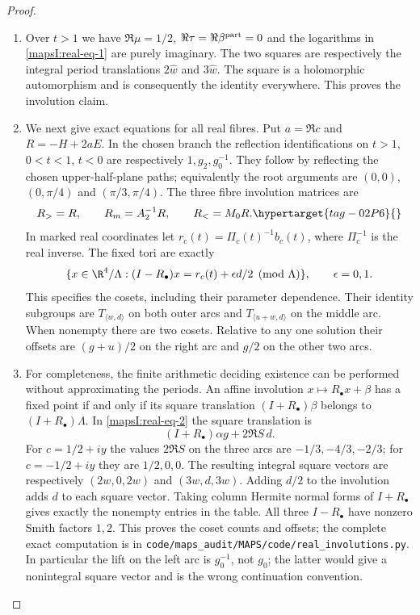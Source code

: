\begin{proof}
\begin{enumerate}[label=\arabic*.,leftmargin=*]
\item Over $t>1$ we have
$\Re\mu=1/2$, $\Re\tau=\Re\beta^{\rm part}=0$ and the logarithms in
\eqref{mapsI:real-eq-1} are purely imaginary. The two squares are respectively the
integral period translations $2\widehat w$ and $3\widehat w$.
The square is a holomorphic automorphism and is consequently the
identity everywhere. This proves the involution claim.

\item We next give exact equations for all real fibres. Put $a=\Re c$ and
$R=-H+2aE$. In the chosen branch the reflection identifications on
$t>1$, $0<t<1$, $t<0$ are respectively $1,g_2,g_0^{-1}$.
They follow by reflecting the chosen upper-half-plane paths; equivalently
the root arguments are $(0,0)$, $(0,\pi/4)$ and $(\pi/3,\pi/4)$.
The three fibre involution matrices are
\[
 R_>=R,\qquad R_m=A_2^{-1}R,\qquad R_<=M_0R.
 \hypertarget{tag-02P6}{}\label{mapsI:real-eq-5}
\]
In marked real coordinates let $r_c(t)=\Pi_c(t)^{-1}b_c(t)$,
where $\Pi_c^{-1}$ is the real inverse. The fixed tori are exactly
\[
 \{x\in\R^4/\Lambda:(I-R_\bullet)x=
                       r_c(t)+\epsilon d/2\pmod\Lambda\},
 \qquad\epsilon=0,1.
 \label{mapsI:real-eq-6}
\]
This specifies the cosets, including their parameter dependence. Their
identity subgroups are $T_{\langle w,d\rangle}$ on both outer arcs and
$T_{\langle u+w,d\rangle}$ on the middle arc. When nonempty there are
two cosets. Relative to any one solution their offsets are
$(g+u)/2$ on the right arc and $g/2$ on the other two arcs.

\item For completeness, the finite arithmetic deciding existence can be
performed without approximating the periods. An affine involution
$x\mapsto R_\bullet x+\beta$ has a fixed point if and only if its
square translation $(I+R_\bullet)\beta$ belongs to
$(I+R_\bullet)\Lambda$. In \eqref{mapsI:real-eq-2} the square translation is
\[
 (I+R_\bullet)\alpha g+2\Re S\,d.
\]
For $c=1/2+iy$ the values $2\Re S$ on the three arcs are
$-1/3,-4/3,-2/3$; for $c=-1/2+iy$ they are $1/2,0,0$.
The resulting integral square vectors are respectively
$(2w,0,2w)$ and $(3w,d,3w)$. Adding $d/2$ to the involution adds $d$
to each square vector. Taking column Hermite normal forms of
$I+R_\bullet$ gives exactly the nonempty entries in the table.
All three $I-R_\bullet$ have nonzero Smith factors $1,2$.
This proves the coset counts and offsets; the complete exact computation
is in \texttt{code/maps\_audit/MAPS/code/real\_involutions.py}. In particular the lift on
the left arc is $g_0^{-1}$, not $g_0$; the latter would give a nonintegral
square vector and is the wrong continuation convention.


\end{enumerate}
\end{proof}
